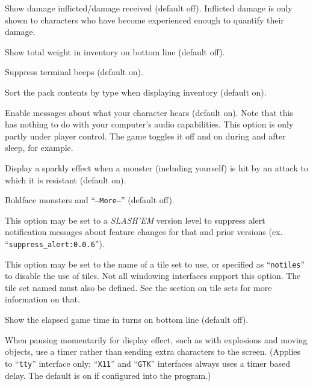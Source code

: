 \item[\ib{showdmg}]
Show damage inflicted/damage received (default off).  Inflicted
damage is only shown to characters who have become experienced
enough to quantify their damage.

\item[\ib{showweight}]
Show total weight in inventory on bottom line (default off).

\item[\ib{silent}]
Suppress terminal beeps (default on).

\item[\ib{sortpack}]
Sort the pack contents by type when displaying inventory (default on).

\item[\ib{sound}]
Enable messages about what your character hears (default on).
Note that this has nothing to do with your computer's audio capabilities.
This option is only partly under player control.  The game toggles it
off and on during and after sleep, for example.

\item[\ib{sparkle}]
Display a sparkly effect when a monster (including yourself) is hit by an
attack to which it is resistant (default on).

\item[\ib{standout}]
Boldface monsters and ``{\tt --More--}'' (default off).

\item[\ib{suppress\_alert}]
This option may be set to a {\it SLASH'EM\/} version level to suppress
alert notification messages about feature changes for that 
and prior versions (ex. ``{\tt suppress\_alert:0.0.6}'').

\item[\ib{tiles}]
This option may be set to the name of a tile set to use, or specified
as ``{\tt notiles}'' to disable the use of tiles. Not all windowing interfaces
support this option. The tile set named must also be defined. See the
section on tile sets for more information on that.

\item[\ib{time}]
Show the elapsed game time in turns on bottom line (default off).

\item[\ib{timed\_delay}]
When pausing momentarily for display effect, such as with explosions and
moving objects, use a timer rather than sending extra characters to the
screen.  (Applies to ``{\tt tty}'' interface only; ``{\tt X11}'' and ``{\tt GTK}'' interfaces always
uses a timer based delay.  The default is on if configured into the
program.)

